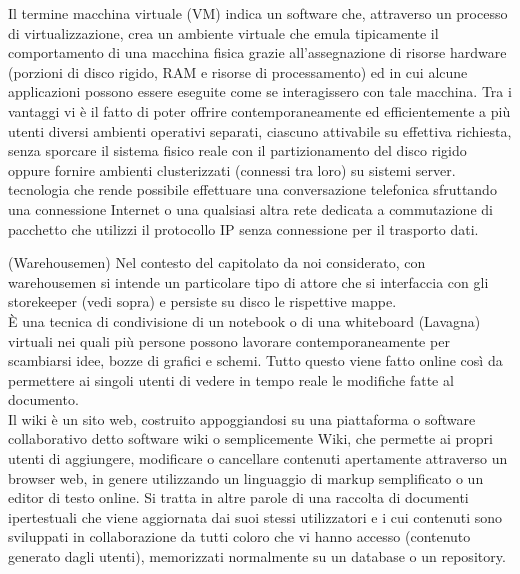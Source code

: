 \documentclass{scalatekids-article}
\begin{document}
   Il termine macchina virtuale (VM) indica un software che, attraverso un processo di virtualizzazione, crea un ambiente virtuale che emula tipicamente il comportamento di una macchina fisica grazie all'assegnazione di risorse hardware (porzioni di disco rigido, RAM e risorse di processamento) ed in cui alcune applicazioni possono essere eseguite come se interagissero con tale macchina.
  Tra i vantaggi vi è il fatto di poter offrire contemporaneamente ed efficientemente a più utenti diversi ambienti operativi separati, ciascuno attivabile su effettiva richiesta, senza sporcare il sistema fisico reale con il partizionamento del disco rigido oppure fornire ambienti clusterizzati (connessi tra loro) su sistemi server.
  \\

   tecnologia che rende possibile effettuare una conversazione telefonica sfruttando una connessione Internet o una qualsiasi altra rete dedicata a commutazione di pacchetto che utilizzi il protocollo IP senza connessione per il trasporto dati.
  \\


  \glossDef(Warehousemen) Nel contesto del capitolato da noi considerato, con warehousemen si intende un particolare tipo di attore che si interfaccia con gli storekeeper (vedi sopra) e persiste su disco le rispettive mappe.
  \\

   È una tecnica di condivisione di un notebook o di una whiteboard (Lavagna) virtuali nei quali più persone possono lavorare contemporaneamente per scambiarsi idee, bozze di grafici e schemi.
  Tutto questo viene fatto online così da permettere ai singoli utenti di vedere in tempo reale le modifiche fatte al documento.
  \\

   Il wiki è un sito web, costruito appoggiandosi su una piattaforma o software collaborativo detto software wiki o semplicemente Wiki, che permette ai propri utenti di aggiungere, modificare o cancellare contenuti apertamente attraverso un browser web, in genere utilizzando un linguaggio di markup semplificato o un editor di testo online.
  Si tratta in altre parole di una raccolta di documenti ipertestuali che viene aggiornata dai suoi stessi utilizzatori e i cui contenuti sono sviluppati in collaborazione da tutti coloro che vi hanno accesso (contenuto generato dagli utenti), memorizzati normalmente su un database o un repository.
  \\



\end{document}
